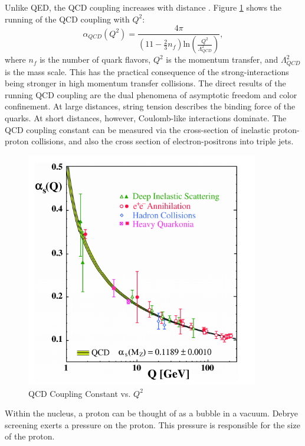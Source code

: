 Unlike QED, the QCD coupling increases with distance \cite{Bethke:2006ac}. Figure \ref{fig:runningQCDCoupling} shows the running of the QCD coupling with $Q^2$:
\begin{equation}
\alpha_{QCD}(Q^2) = \frac{4 \pi }{(11 - \frac{2}{3}n_f)\mathrm{ln}(\frac{Q^2}{\Lambda^2_{QCD}}) } ,
\end{equation}
where $n_f$ is the number of quark flavors, $Q^2$ is the momentum transfer, and  $\Lambda^2_{QCD}$ is the mass scale. 
This has the practical consequence of the strong-interactions being stronger in high momentum transfer collisions. The direct results of the running QCD coupling are the dual phenomena of asymptotic freedom and color confinement. At large distances, string tension describes the binding force of the quarks. At short distances, however, Coulomb-like interactions dominate. The QCD coupling constant can be measured via the cross-section of inelastic proton-proton collisions, and also the cross section of electron-positrons into triple jets. 
\begin{figure}[h!]
\begin{centering}
\includegraphics[width=4in]{Chapter1/importfigs/qcd_coupling_bethke.png}
\par\end{centering}
\caption{QCD Coupling Constant vs. $Q^2$ \cite{Bethke:2006ac} \label{fig:runningQCDCoupling}}
\end{figure}

Within the nucleus, a proton can be thought of as a bubble in a vacuum. Debrye screening exerts a pressure on the proton. This pressure is responsible for the size of the proton. 

